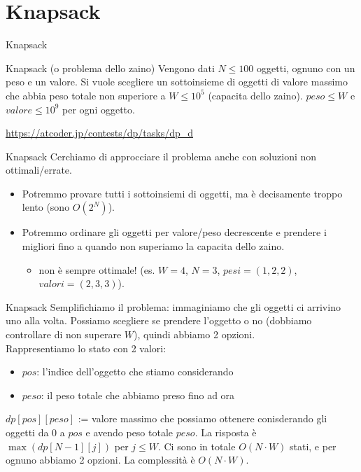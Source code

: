 \documentclass{beamer}
\begin{document}
\section{Knapsack}
\begin{frame}{Knapsack}
    \begin{exampleblock}{Knapsack (o problema dello zaino)}
        Vengono dati $N \le 100$ oggetti, ognuno con un peso e un valore. Si vuole scegliere 
        un sottoinsieme di oggetti di valore massimo che abbia peso totale non superiore a $W \le 10^5$ (capacita dello zaino).
        $peso \le W$ e $valore \le 10^9$ per ogni oggetto.
    \end{exampleblock}
    \small{\underline{\url{https://atcoder.jp/contests/dp/tasks/dp_d}}}
\end{frame}

\begin{frame}{Knapsack}
    Cerchiamo di approcciare il problema anche con soluzioni non ottimali/errate. \\
    \begin{itemize}
        \item Potremmo provare tutti i sottoinsiemi di oggetti, ma \`e decisamente troppo lento (sono $O(2^N)$).\\
        \pause
        \item Potremmo ordinare gli oggetti per valore/peso decrescente e prendere i migliori fino a quando non superiamo la capacita dello zaino.\\
        \pause
        \begin{itemize}
            \item non \`e sempre ottimale! (es. $W=4$, $N=3$, $pesi = (1, 2, 2)$, $valori = (2, 3, 3)$).
        \end{itemize}
    \end{itemize}
\end{frame}

\begin{frame}{Knapsack}
    Semplifichiamo il problema: immaginiamo che gli oggetti ci arrivino uno alla volta.
    Possiamo scegliere se prendere l'oggetto o no (dobbiamo controllare di non superare $W$), quindi abbiamo 2 opzioni.\\
    \vfill
    \pause
    Rappresentiamo lo stato con 2 valori:
    \pause
    \begin{itemize}
        \item $pos$: l'indice dell'oggetto che stiamo considerando
        \item $peso$: il peso totale che abbiamo preso fino ad ora
    \end{itemize}
    \pause
    $dp[pos][peso]$ := valore massimo che possiamo ottenere conisderando gli oggetti da $0$ a $pos$ e avendo peso totale $peso$. La risposta \`e $\max(dp[N-1][j])$ per $j \leq W$.
    \pause
    \vfill
    Ci sono in totale $O(N \cdot W)$ stati, e per ognuno abbiamo 2 opzioni. La complessit\`a \`e $O(N \cdot W)$.\\
\end{frame}
\end{document}
